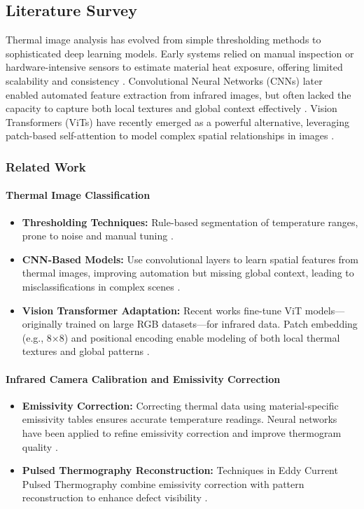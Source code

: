 
\subsection{Literature Survey}
Thermal image analysis has evolved from simple thresholding methods to sophisticated deep learning models. Early systems relied on manual inspection or hardware-intensive sensors to estimate material heat exposure, offering limited scalability and consistency \cite{Li2023}. Convolutional Neural Networks (CNNs) later enabled automated feature extraction from infrared images, but often lacked the capacity to capture both local textures and global context effectively \cite{Zheng2021}. Vision Transformers (ViTs) have recently emerged as a powerful alternative, leveraging patch-based self-attention to model complex spatial relationships in images \cite{Dosovitskiy2021,Liu2024}.

\subsubsection{Related Work}

\paragraph{Thermal Image Classification}
\begin{itemize}[leftmargin=*]
    \item \textbf{Thresholding Techniques:} Rule-based segmentation of temperature ranges, prone to noise and manual tuning \cite{Li2023}.
    \item \textbf{CNN-Based Models:} Use convolutional layers to learn spatial features from thermal images, improving automation but missing global context, leading to misclassifications in complex scenes \cite{Zheng2021}.
    \item \textbf{Vision Transformer Adaptation:} Recent works fine-tune ViT models—originally trained on large RGB datasets—for infrared data. Patch embedding (e.g., 8×8) and positional encoding enable modeling of both local thermal textures and global patterns \cite{Dosovitskiy2021,Liu2024}.  
\end{itemize}

\paragraph{Infrared Camera Calibration and Emissivity Correction}
\begin{itemize}[leftmargin=*]
    \item \textbf{Emissivity Correction:} Correcting thermal data using material-specific emissivity tables ensures accurate temperature readings. Neural networks have been applied to refine emissivity correction and improve thermogram quality \cite{Schmid2025}.
    \item \textbf{Pulsed Thermography Reconstruction:} Techniques in Eddy Current Pulsed Thermography combine emissivity correction with pattern reconstruction to enhance defect visibility \cite{Li2023}.
\end{itemize}

